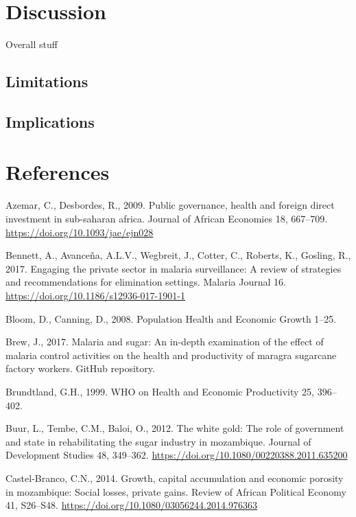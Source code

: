 \documentclass[]{article}
\begin{document}
\section{Discussion}\label{discussion}

Overall stuff

\subsection{Limitations}\label{limitations}

\subsection{Implications}\label{implications}

\section*{References}\label{references}

\hypertarget{refs}{}
\hypertarget{ref-Azemar2009}{}
Azemar, C., Desbordes, R., 2009. Public governance, health and foreign
direct investment in sub-saharan africa. Journal of African Economies
18, 667--709. \url{https://doi.org/10.1093/jae/ejn028}

\hypertarget{ref-Bennett_2017}{}
Bennett, A., Avanceña, A.L.V., Wegbreit, J., Cotter, C., Roberts, K.,
Gosling, R., 2017. Engaging the private sector in malaria surveillance:
A review of strategies and recommendations for elimination settings.
Malaria Journal 16. \url{https://doi.org/10.1186/s12936-017-1901-1}

\hypertarget{ref-Bloom2008}{}
Bloom, D., Canning, D., 2008. Population Health and Economic Growth
1--25.

\hypertarget{ref-brewgit}{}
Brew, J., 2017. Malaria and sugar: An in-depth examination of the effect
of malaria control activities on the health and productivity of maragra
sugarcane factory workers. GitHub repository.

\hypertarget{ref-World1999}{}
Brundtland, G.H., 1999. WHO on Health and Economic Productivity 25,
396--402.

\hypertarget{ref-Buur2012}{}
Buur, L., Tembe, C.M., Baloi, O., 2012. The white gold: The role of
government and state in rehabilitating the sugar industry in mozambique.
Journal of Development Studies 48, 349--362.
\url{https://doi.org/10.1080/00220388.2011.635200}

\hypertarget{ref-CastelBranco2014}{}
Castel-Branco, C.N., 2014. Growth, capital accumulation and economic
porosity in mozambique: Social losses, private gains. Review of African
Political Economy 41, S26--S48.
\url{https://doi.org/10.1080/03056244.2014.976363}
\end{document}
